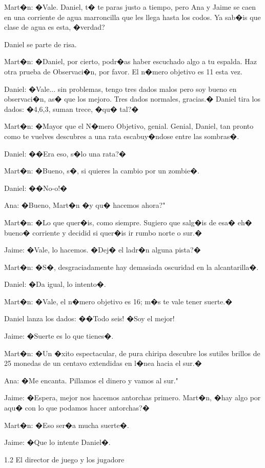 Mart�n: �Vale. Daniel, t� te paras justo a tiempo, pero Ana y Jaime se caen en una corriente de agua marroncilla que les llega hasta los codos. Ya sab�is que clase de agua es esta, �verdad? 


Daniel se parte de risa.


Mart�n: �Daniel, por cierto, podr�as haber escuchado algo a tu espalda. Haz otra prueba de Observaci�n, por favor. El n�mero objetivo es 11 esta vez. 


Daniel: �Vale... sin problemas, tengo tres dados malos pero soy bueno en observaci�n, as� que los mejoro. Tres dados normales, gracias.� Daniel tira los dados: �4,6,3, suman trece, �qu� tal?�


Mart�n: �Mayor que el N�mero Objetivo, genial. Genial, Daniel, tan pronto como te vuelves descubres a una rata escabuy�ndose entre las sombras�.


Daniel: ��Era eso, s�lo una rata?�


Mart�n: �Bueno, s�, si quieres la cambio por un zombie�.


Daniel: ��No-o!�


Ana: �Bueno, Mart�n �y qu� hacemos ahora?"


Mart�n: �Lo que quer�is, como siempre. Sugiero que salg�is de esa� eh� bueno� corriente y decidid si quer�is ir rumbo norte o sur.�


Jaime: �Vale, lo hacemos. �Dej� el ladr�n alguna pista?�


Mart�n: �S�, desgraciadamente hay demasiada oscuridad en la alcantarilla�.


Daniel: �Da igual, lo intento�.


Mart�n: �Vale, el n�mero objetivo es 16; m�s te vale tener suerte.�


Daniel lanza los dados: ��Todo seis! �Soy el mejor!


Jaime: �Suerte es lo que tienes�.


Mart�n: �Un �xito espectacular, de pura chiripa descubre los sutiles brillos de 25 monedas de un centavo extendidas en l�nea hacia el sur.�


Ana: �Me encanta. Pillamos el dinero y vamos al sur."


Jaime: �Espera, mejor nos hacemos antorchas primero. Mart�n, �hay algo por aqu� con lo que podamos hacer antorchas?�


Mart�n: �Eso ser�a mucha suerte�.


Jaime: �Que lo intente Daniel�.


1.2 El director de juego y los jugadore


